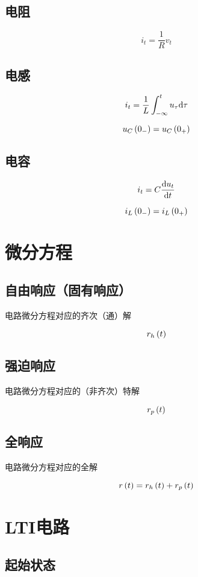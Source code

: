 \documentclass{article}
\begin{document}
\subsection{电阻}

\[i_t=\frac1Rv_t\]

\subsection{电感}

\[i_t=\frac1L\int_{-\infty}^tu_\tau\mathrm d\tau\]

\[u_C\left(0_-\right)=u_C\left(0_+\right)\]

\subsection{电容}

\[i_t=C\frac{\mathrm d u_t}{\mathrm d t}\]

\[i_L\left(0_-\right)=i_L\left(0_+\right)\]

\section{微分方程}

\subsection{自由响应（固有响应）}

电路微分方程对应的齐次（通）解

\[r_h\left(t\right)\]

\subsection{强迫响应}

电路微分方程对应的（非齐次）特解

\[r_p\left(t\right)\]

\subsection{全响应}

电路微分方程对应的全解

\[r\left(t\right)=r_h\left(t\right)+r_p\left(t\right)\]

\section{LTI电路}

\subsection{起始状态}
\end{document}
